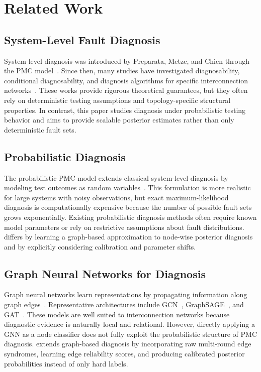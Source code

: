 \section{Related Work}\label{related-work}

\subsection{System-Level Fault Diagnosis}
System-level diagnosis was introduced by Preparata, Metze, and Chien through the PMC model~\cite{pmc67}. Since then, many studies have investigated diagnosability, conditional diagnosability, and diagnosis algorithms for specific interconnection networks~\cite{wang1994diagnosability,zhu2016diagnosis,chang2020conditional,tang2024connectivity}. These works provide rigorous theoretical guarantees, but they often rely on deterministic testing assumptions and topology-specific structural properties. In contrast, this paper studies diagnosis under probabilistic testing behavior and aims to provide scalable posterior estimates rather than only deterministic fault sets.

\subsection{Probabilistic Diagnosis}
The probabilistic PMC model extends classical system-level diagnosis by modeling test outcomes as random variables~\cite{blough1989efficient,sun2023probabilistic}. This formulation is more realistic for large systems with noisy observations, but exact maximum-likelihood diagnosis is computationally expensive because the number of possible fault sets grows exponentially. Existing probabilistic diagnosis methods often require known model parameters or rely on restrictive assumptions about fault distributions. \tool differs by learning a graph-based approximation to node-wise posterior diagnosis and by explicitly considering calibration and parameter shifts.

\subsection{Graph Neural Networks for Diagnosis}
Graph neural networks learn representations by propagating information along graph edges~\cite{scarselli2008graph}. Representative architectures include GCN~\cite{kipf2017semi}, GraphSAGE~\cite{hamilton2017inductive}, and GAT~\cite{velivckovic2017graph}. These models are well suited to interconnection networks because diagnostic evidence is naturally local and relational. However, directly applying a GNN as a node classifier does not fully exploit the probabilistic structure of PMC diagnosis. \tool extends graph-based diagnosis by incorporating raw multi-round edge syndromes, learning edge reliability scores, and producing calibrated posterior probabilities instead of only hard labels.

